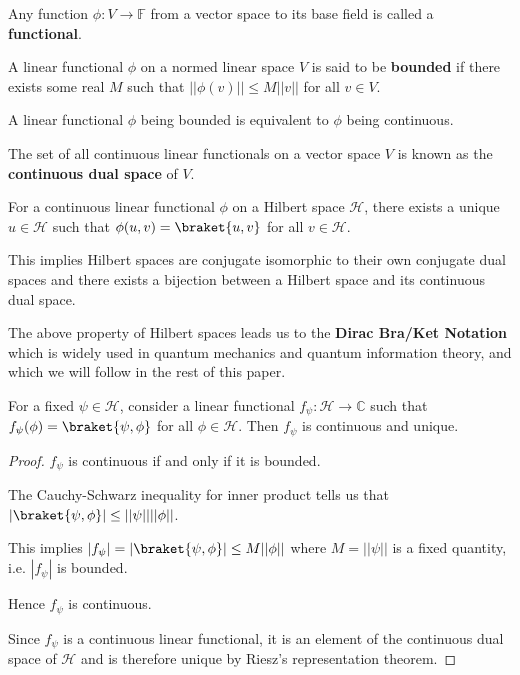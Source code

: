 \begin{defn}
    Any function $\phi: V \to \mathbb{F}$ from a vector space to its base field is called a \textbf{functional}. 
\end{defn}

\begin{defn}
A linear functional $\phi$ on a normed linear space $V$ is said to be \textbf{bounded} if there exists some real $M$ such that $|| \phi(v)|| \leq M ||v||$ for all $v \in V$. 
\end{defn}

\begin{note}
A linear functional $\phi$ being bounded is equivalent to $\phi$ being continuous.
\end{note}


\begin{defn}
    The set of all continuous linear functionals on a vector space $V$ is known as the \textbf{continuous dual space} of $V$.
\end{defn}

\begin{result}
    For a continuous linear functional $\phi$ on a Hilbert space $\mathcal{H}$, there exists a unique $u \in \mathcal{H}$ such that $\phi(u,v) = \braket{u,v}$ for all $v \in \mathcal{H}$. 

    This implies Hilbert spaces are conjugate isomorphic to their own conjugate dual spaces and there exists a bijection between a Hilbert space and its continuous dual space.
\end{result}

The above property of Hilbert spaces leads us to the \textbf{Dirac Bra/Ket Notation} which is widely used in quantum mechanics and quantum information theory, and which we will follow in the rest of this paper.

\begin{samepage}
\begin{thm}
\label{innerproduct:continuous}
For a fixed $\psi \in \mathcal{H}$, consider a linear functional $f_\psi : \mathcal{H} \to \mathbb{C}$ such that $f_\psi(\phi) = \braket{\psi,\phi}$ for all $\phi \in \mathcal{H}$. Then $f_\psi$ is continuous and unique. 
\end{thm}
\begin{proof}
    $f_\psi$ is continuous if and only if it is bounded. 

    The Cauchy-Schwarz inequality for inner product tells us that $|\braket{\psi,\phi}| \leq ||\psi||||\phi||$.

    This implies $|f_\psi| = |\braket{\psi,\phi}| \leq M ||\phi||$ where $M = ||\psi||$ is a fixed quantity, i.e. $|f_\psi|$ is bounded.

    Hence $f_\psi$ is continuous. 

    
    Since $f_\psi$ is a continuous linear functional, it is an element of the continuous dual space of $\mathcal{H}$ and is therefore unique by Riesz's representation theorem.
\end{proof}
\end{samepage}

